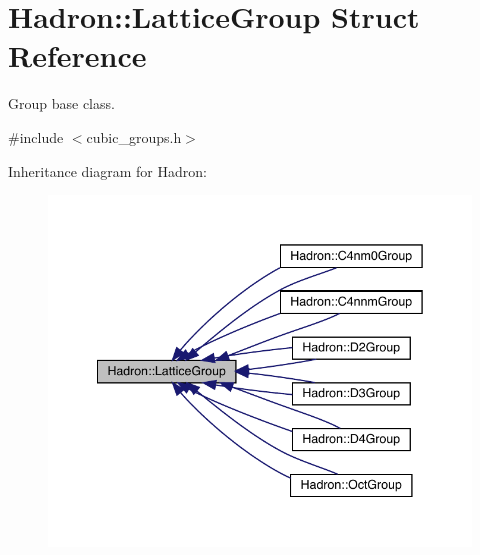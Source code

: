 \hypertarget{structHadron_1_1LatticeGroup}{}\section{Hadron\+:\+:Lattice\+Group Struct Reference}
\label{structHadron_1_1LatticeGroup}


Group base class.  




{\ttfamily \#include $<$cubic\+\_\+groups.\+h$>$}



Inheritance diagram for Hadron\+:\nopagebreak
\begin{figure}[H]
\begin{center}
\leavevmode
\includegraphics[width=342pt]{d1/d71/structHadron_1_1LatticeGroup__inherit__graph}
\end{center}
\end{figure}
